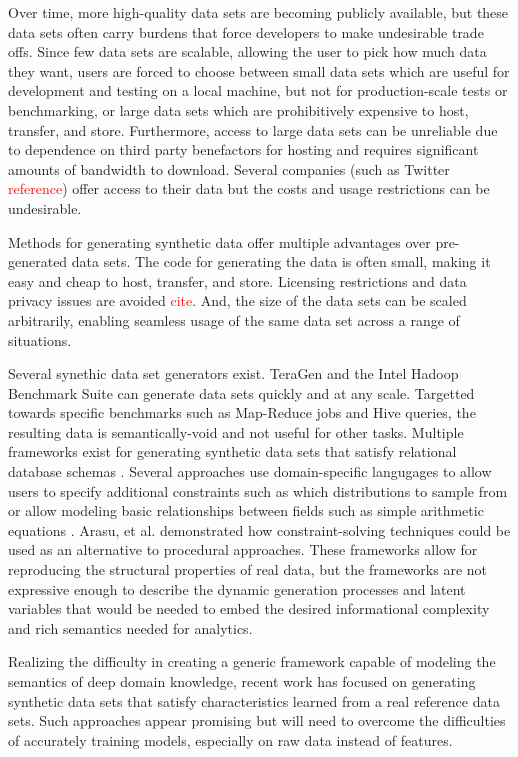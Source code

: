 \documentclass[conference]{IEEEtran}
\begin{document}
Over time, more high-quality data sets are becoming publicly available, but these data sets often carry burdens that force developers to make undesirable trade offs. Since few data sets are scalable, allowing the user to pick how much data they want, users are forced to choose between small data sets which are useful for development and testing on a local machine, but not for production-scale tests or benchmarking, or large data sets which are prohibitively expensive to host, transfer, and store. Furthermore, access to large data sets can be unreliable due to dependence on third party benefactors for hosting and requires significant amounts of bandwidth to download.  Several companies (such as Twitter \textcolor{red}{reference}) offer access to their data but the costs and usage restrictions can be undesirable.

Methods for generating synthetic data offer multiple advantages over pre-generated data sets.  The code for generating the data is often small, making it easy and cheap to host, transfer, and store. Licensing restrictions and data privacy issues are avoided \textcolor{red}{cite}.  And, the size of the data sets can be scaled arbitrarily, enabling seamless usage of the same data set across a range of situations.  

Several synethic data set generators exist.  TeraGen and the Intel Hadoop Benchmark Suite \cite{Huang2010} can generate data sets quickly and at any scale. Targetted towards specific benchmarks such as Map-Reduce jobs and Hive queries, the resulting data is semantically-void and not useful for other tasks.  Multiple frameworks exist for generating synthetic data sets that satisfy relational database schemas \cite{Ghazal2013,Rabl2011a,Frank2012,Rabl2011,Gray1994,Bruno2005,Hoag2007}. Several approaches use domain-specific langugages \cite{Bruno2005,Hoag2007} to allow users to specify additional constraints such as which distributions to sample from or allow modeling basic relationships between fields such as simple arithmetic equations \cite{Alexandrov2012}. Arasu, et al. \cite{Arasu2011} demonstrated how constraint-solving techniques could be used as an alternative to procedural approaches. These frameworks allow for reproducing the structural properties of real data, but the frameworks are not expressive enough to describe the dynamic generation processes and latent variables that would be needed to embed the desired informational complexity and rich semantics needed for analytics.

Realizing the difficulty in creating a generic framework capable of modeling the semantics of deep domain knowledge, recent work\cite{Alexandrov2013} has focused on generating synthetic data sets that satisfy characteristics learned from a real reference data sets. Such approaches appear promising but will need to overcome the difficulties of accurately training models, especially on raw data instead of features.
\end{document}
